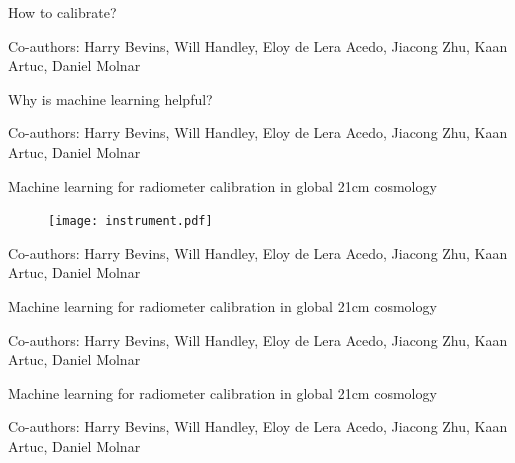 \documentclass{beamer}
\begin{document}
\begin{frame}{\small{How to calibrate?}}
\begin{figure}[h]
  \centering
  
\end{figure}

\vfill
    \tiny{Co-authors: Harry Bevins, Will Handley, Eloy de Lera Acedo, Jiacong Zhu, Kaan Artuc, Daniel Molnar}
  \end{frame}


\begin{frame}{\small{Why is machine learning helpful?}}
\begin{figure}[h]
  \centering
  
\end{figure}

\vfill
    \tiny{Co-authors: Harry Bevins, Will Handley, Eloy de Lera Acedo, Jiacong Zhu, Kaan Artuc, Daniel Molnar}
  \end{frame}

\begin{frame}{\small{Machine learning for radiometer calibration in global 21cm cosmology}}
  \begin{figure}
    \centering
    \texttt{[image: instrument.pdf]}
  \end{figure}
\vfill
    \tiny{Co-authors: Harry Bevins, Will Handley, Eloy de Lera Acedo, Jiacong Zhu, Kaan Artuc, Daniel Molnar}
  \end{frame}

  \begin{frame}{\small{Machine learning for radiometer calibration in global 21cm cosmology}}
    \begin{figure}
    \centering
    
  \end{figure}
\vfill
    \tiny{Co-authors: Harry Bevins, Will Handley, Eloy de Lera Acedo, Jiacong Zhu, Kaan Artuc, Daniel Molnar}

  \end{frame}

  \begin{frame}{\small{Machine learning for radiometer calibration in global 21cm cosmology}}
    \begin{figure}
      \centering
      
    \end{figure}

    \begin{figure}
    \centering
    
  \end{figure}
\vfill
    \tiny{Co-authors: Harry Bevins, Will Handley, Eloy de Lera Acedo, Jiacong Zhu, Kaan Artuc, Daniel Molnar}
  \end{frame}
\end{document}
